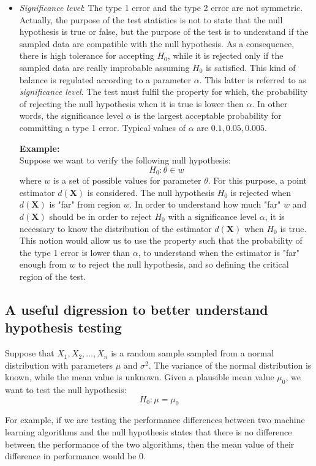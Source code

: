 \begin{itemize}
    \item \textit{Significance level}: The type 1 error and the type 2 error are not symmetric. Actually, the purpose of the test statistics is not to state that the null hypothesis is true or false, but the purpose of the test is to understand if the sampled data are compatible with the null hypothesis. As a consequence, there is high tolerance for accepting $H_0$, while it is rejected only if the sampled data are really improbable assuming $H_0$ is satisfied. This kind of balance is regulated according to a parameter $\alpha$. This latter is referred to as \textit{significance level}. The test must fulfil the property for which, the probability of rejecting the null hypothesis when it is true is lower then $\alpha$. In other words, the significance level $\alpha$ is the largest acceptable probability for committing a type 1 error. Typical values of $\alpha$ are $0.1, 0.05, 0.005$. \newline
    
    \textbf{Example:}\\
    Suppose we want to verify the following null hypothesis:
    $$H_0 : \theta \in w$$
    where $w$ is a set of possible values for parameter $\theta$. For this purpose, a point estimator $d(\pmb{X})$ is considered. The null hypothesis $H_0$ is rejected when $d(\pmb{X})$ is "far" from region $w$. In order to understand how much "far" $w$ and $d(\pmb{X})$ should be in order to reject $H_0$ with a significance level $\alpha$, it is necessary to know the distribution of the estimator $d(\pmb{X})$ when $H_0$ is true. This notion would allow us to use the property such that the probability of the type 1 error is lower than $\alpha$, to understand when the estimator is "far" enough from $w$ to reject the null hypothesis, and so defining the critical region of the test. 
\end{itemize}

\subsection{A useful digression to better understand hypothesis testing}
Suppose that $X_1, X_2, \hdots, X_n$ is a random sample sampled from a normal distribution with parameters $\mu$ and $\sigma^2$. The variance of the normal distribution is known, while the mean value is unknown. Given a plausible mean value $\mu_0$, we want to test the null hypothesis:
$$H_0 : \mu = \mu_0$$

For example, if we are testing the performance differences between two machine learning algorithms and the null hypothesis states that there is no difference between the performance of the two algorithms, then the mean value of their difference in performance would be 0. \newline

